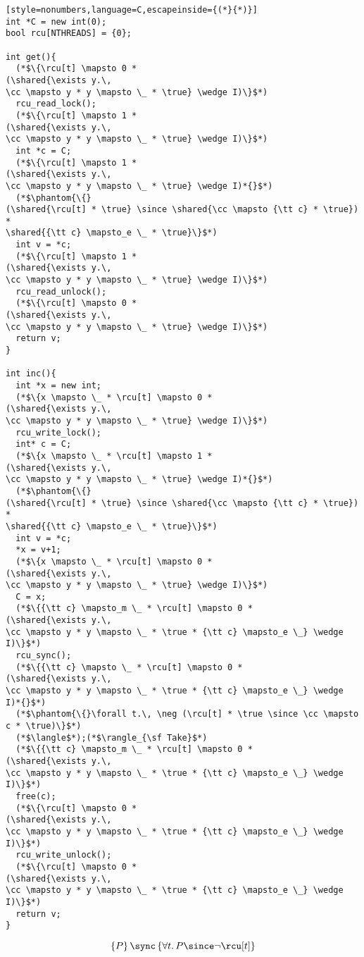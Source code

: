{\small
\begin{lstlisting}[style=nonumbers,language=C,escapeinside={(*}{*)}]
int *C = new int(0);
bool rcu[NTHREADS] = {0};

int get(){
  (*$\{\rcu[t] \mapsto 0 *
(\shared{\exists y.\, 
\cc \mapsto y * y \mapsto \_ * \true} \wedge I)\}$*)
  rcu_read_lock(); 
  (*$\{\rcu[t] \mapsto 1 *
(\shared{\exists y.\, 
\cc \mapsto y * y \mapsto \_ * \true} \wedge I)\}$*)
  int *c = C;
  (*$\{\rcu[t] \mapsto 1 *
(\shared{\exists y.\, 
\cc \mapsto y * y \mapsto \_ * \true} \wedge I)*{}$*)
  (*$\phantom{\{}
(\shared{\rcu[t] * \true} \since \shared{\cc \mapsto {\tt c} * \true}) *
\shared{{\tt c} \mapsto_e \_ * \true}\}$*)
  int v = *c;
  (*$\{\rcu[t] \mapsto 1 *
(\shared{\exists y.\, 
\cc \mapsto y * y \mapsto \_ * \true} \wedge I)\}$*)
  rcu_read_unlock();
  (*$\{\rcu[t] \mapsto 0 *
(\shared{\exists y.\, 
\cc \mapsto y * y \mapsto \_ * \true} \wedge I)\}$*)
  return v;
}

int inc(){
  int *x = new int;
  (*$\{x \mapsto \_ * \rcu[t] \mapsto 0 *
(\shared{\exists y.\, 
\cc \mapsto y * y \mapsto \_ * \true} \wedge I)\}$*)
  rcu_write_lock();
  int* c = C;
  (*$\{x \mapsto \_ * \rcu[t] \mapsto 1 *
(\shared{\exists y.\, 
\cc \mapsto y * y \mapsto \_ * \true} \wedge I)*{}$*)
  (*$\phantom{\{}
(\shared{\rcu[t] * \true} \since \shared{\cc \mapsto {\tt c} * \true}) *
\shared{{\tt c} \mapsto_e \_ * \true}\}$*)
  int v = *c;
  *x = v+1;
  (*$\{x \mapsto \_ * \rcu[t] \mapsto 0 *
(\shared{\exists y.\, 
\cc \mapsto y * y \mapsto \_ * \true} \wedge I)\}$*)
  C = x;
  (*$\{{\tt c} \mapsto_m \_ * \rcu[t] \mapsto 0 *
(\shared{\exists y.\, 
\cc \mapsto y * y \mapsto \_ * \true * {\tt c} \mapsto_e \_} \wedge I)\}$*)
  rcu_sync();
  (*$\{{\tt c} \mapsto \_ * \rcu[t] \mapsto 0 *
(\shared{\exists y.\, 
\cc \mapsto y * y \mapsto \_ * \true * {\tt c} \mapsto_e \_} \wedge I)*{}$*)
  (*$\phantom{\{}\forall t.\, \neg (\rcu[t] * \true \since \cc \mapsto c * \true)\}$*)
  (*$\langle$*);(*$\rangle_{\sf Take}$*)
  (*$\{{\tt c} \mapsto_m \_ * \rcu[t] \mapsto 0 *
(\shared{\exists y.\, 
\cc \mapsto y * y \mapsto \_ * \true * {\tt c} \mapsto_e \_} \wedge I)\}$*)
  free(c);
  (*$\{\rcu[t] \mapsto 0 *
(\shared{\exists y.\, 
\cc \mapsto y * y \mapsto \_ * \true * {\tt c} \mapsto_e \_} \wedge I)\}$*)
  rcu_write_unlock();
  (*$\{\rcu[t] \mapsto 0 *
(\shared{\exists y.\, 
\cc \mapsto y * y \mapsto \_ * \true * {\tt c} \mapsto_e \_} \wedge I)\}$*)
  return v;
}
\end{lstlisting}
}


$$
\{P\}\, \sync\, \{\forall t.\, P \since \neg\rcu[t]\}
$$

